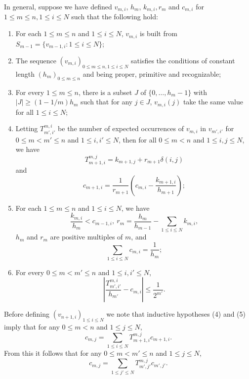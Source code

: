 \documentclass{amsart}
\theoremstyle{definition}
\theoremstyle{problem}
\theoremstyle{remark}
\numberwithin{equation}{section}
\begin{document}
In general, suppose we have defined $v_{m,i}$, $h_m$, $k_{m,i}, r_m$ and $c_{m,i}$  for $1\le m\le n, 1\le i\le N$ such that the following hold:
\begin{enumerate}
\item For each $1\leq m\leq n$ and $1\leq i\leq N$, $v_{m,i}$ is built from $S_{m-1}=\{v_{m-1, i}\colon 1\leq i\leq N\}$;
\item The sequence $(v_{m,i})_{0\leq m\leq n, 1\leq i\leq N}$ satisfies the conditions of constant length $(h_m)_{0\leq m\leq n}$ and being proper, primitive and recognizable;
\item For every $1\leq m\leq n$, there is a subset $J$ of $\{0,\dots, h_m-1\}$ with $|J|\geq (1-1/m)h_m$ such that for any $j\in J$, $v_{m,i}(j)$ take the same value for all $1\leq i\leq N$;

\item Letting $T^{m,i}_{m', i'}$ be the number of expected occurrences of $v_{m,i}$ in $v_{m',i'}$ for $0\leq m<m'\leq n$ and $1\le i, i'\leq N$, then for all $0\le m<n$ and $1\leq i,j\leq N$, we have
$$ T^{m,j}_{m+1,i}=k_{m+1,j}+r_{m+1}\delta(i,j) $$ 
and 
$$c_{m+1,i}=\displaystyle\frac{1}{r_{m+1}} \left(c_{m,i}-\displaystyle\frac{k_{m+1,i}}{h_{m+1}}\right); $$ 

\item For each $1\le m\le n$ and $1\leq i\leq N$, we have
$$ \displaystyle\frac{k_{m,i}}{h_{m}}<c_{m-1,i}, \ r_{m}=\displaystyle\frac{h_{m}}{h_{m-1}}-\displaystyle\sum_{1\le i\le N}k_{m,i}, $$ $h_m$ and $r_m$ are positive multiples of $m$, and
$$\sum_{1\le i\le N}c_{m,i}=\displaystyle\frac{1}{h_m}; $$


\item For every $0\le m< m'\le n$ and $1\le i,i'\le  N$, 
$$\left|\displaystyle\frac{T^{m,i}_{m',i'}}{h_{m'}}-c_{m,i}\right|\le\frac{1}{2^{m'}}.$$
\end{enumerate}

Before defining $(v_{n+1,i})_{1\leq i\leq N}$ we note that inductive hypotheses (4) and (5) imply that
for any $0\leq m< n$ and $1\leq j\leq N$, 
$$ c_{m,j}=\displaystyle\sum_{1\leq i\leq N} T^{m,j}_{m+1,i}c_{m+1,i}. $$
From this it follows that for any $0\leq m<m'\leq n$ and $1\leq j\leq N$, 
$$ c_{m,j}=\displaystyle\sum_{1\leq j'\leq N} T^{m,j}_{m',j'}c_{m',j'}. $$
\end{document}
